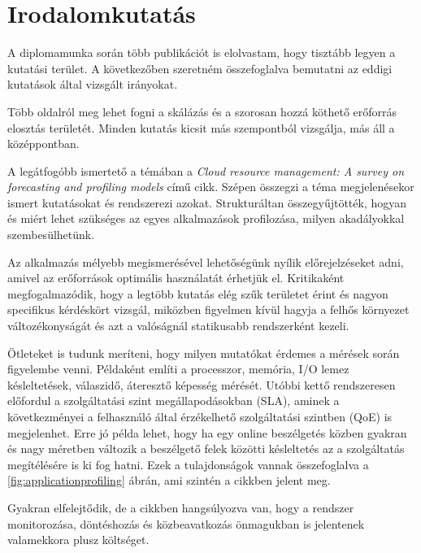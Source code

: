 \chapter{Irodalomkutatás}
\label{sec:Publications}
A diplomamunka során több publikációt is elolvastam, hogy tisztább legyen a kutatási terület. A következőben szeretném összefoglalva bemutatni az eddigi kutatások által vizsgált irányokat.

Több oldalról meg lehet fogni a skálázás és a szorosan hozzá köthető erőforrás elosztás területét. Minden kutatás kicsit más szempontból vizsgálja, más áll a középpontban.

A legátfogóbb ismertető a témában a \emph{Cloud resource management: A survey on forecasting and profiling models}\citep{CloudResourceManagement} című cikk. Szépen összegzi a téma megjelenésekor ismert kutatásokat és rendszerezi azokat. Strukturáltan összegyűjtötték, hogyan és miért lehet szükséges az egyes alkalmazások profilozása, milyen akadályokkal szembesülhetünk.

Az alkalmazás mélyebb megismerésével lehetőségünk nyílik előrejelzéseket adni, amivel az erőforrások optimális használatát érhetjük el.
Kritikaként megfogalmazódik, hogy a legtöbb kutatás elég szűk területet érint és nagyon specifikus kérdéskört vizsgál, miközben figyelmen kívül hagyja a felhős környezet  változékonyságát és azt a valóságnál statikusabb rendszerként kezeli. 

Ötleteket is tudunk meríteni, hogy milyen mutatókat érdemes a mérések során figyelembe venni.
Példaként említi  a processzor, memória, I/O lemez késleltetések, válaszidő, áteresztő képesség mérését.
Utóbbi kettő rendszeresen előfordul a szolgáltatási szint megállapodásokban (SLA), aminek a következményei a felhasználó által érzékelhető szolgáltatási szintben (QoE) is megjelenhet.
Erre jó példa lehet, hogy ha egy online beszélgetés közben gyakran és nagy méretben változik a beszélgető felek közötti késleltetés az a szolgáltatás megítélésére is ki fog hatni.
Ezek a tulajdonságok vannak összefoglalva a \ref{fig:applicationprofiling} ábrán, ami szintén a cikkben jelent meg.

Gyakran elfelejtődik, de a cikkben hangsúlyozva van, hogy a rendszer monitorozása, döntéshozás és közbeavatkozás önmagukban is jelentenek valamekkora plusz költséget. \\


